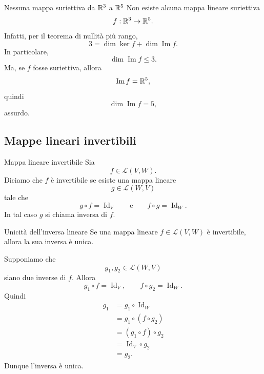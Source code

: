 \documentclass[a4paper]{article}
\begin{document}
\begin{snippetexample}{Nessuna mappa suriettiva da \(\mathbb{R}^3\) a \(\mathbb{R}^5\)}
    Non esiste alcuna mappa lineare suriettiva
    \[
        f:\mathbb{R}^3\to\mathbb{R}^5.
    \]
    Infatti, per il teorema di nullità più rango,
    \[
        3
        =
        \dim\ker f+\dim\operatorname{Im}f.
    \]
    In particolare,
    \[
        \dim\operatorname{Im}f\leq 3.
    \]
    Ma, se \(f\) fosse suriettiva, allora
    \[
        \operatorname{Im}f=\mathbb{R}^5,
    \]
    quindi
    \[
        \dim\operatorname{Im}f=5,
    \]
    assurdo.
\end{snippetexample}

\subsection{Mappe lineari invertibili}

\begin{snippetdefinition}{Mappa lineare invertibile}
    Sia
    \[
        f\in\mathcal{L}(V,W).
    \]
    Diciamo che \(f\) è invertibile se esiste una mappa lineare
    \[
        g\in\mathcal{L}(W,V)
    \]
    tale che
    \[
        g\circ f=\operatorname{Id}_V
        \qquad
        \text{e}
        \qquad
        f\circ g=\operatorname{Id}_W.
    \]
    In tal caso \(g\) si chiama inversa di \(f\).
\end{snippetdefinition}

\begin{snippetproposition}{Unicità dell'inversa lineare}
    Se una mappa lineare \(f\in\mathcal{L}(V,W)\) è invertibile, allora la sua inversa è unica.
\end{snippetproposition}

\begin{snippetproof}{}
    Supponiamo che
    \[
        g_1,g_2\in\mathcal{L}(W,V)
    \]
    siano due inverse di \(f\). Allora
    \[
        g_1\circ f=\operatorname{Id}_V,
        \qquad
        f\circ g_2=\operatorname{Id}_W.
    \]
    Quindi
    \begin{align*}
        g_1
        &=g_1\circ\operatorname{Id}_W\\
        &=g_1\circ(f\circ g_2)\\
        &=(g_1\circ f)\circ g_2\\
        &=\operatorname{Id}_V\circ g_2\\
        &=g_2.
    \end{align*}
    Dunque l'inversa è unica.
\end{snippetproof}
\end{document}
